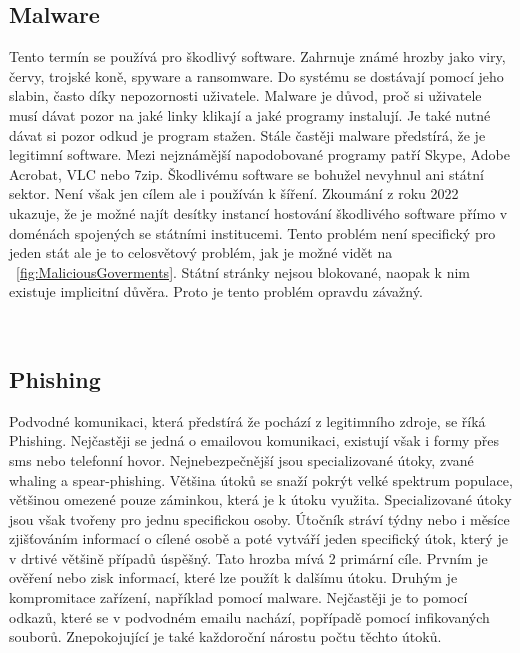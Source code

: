 \subsection{Malware}
Tento termín se používá pro škodlivý software.
Zahrnuje známé hrozby jako viry, červy, trojské koně, spyware a ransomware.
Do systému se dostávají pomocí jeho slabin, často díky nepozornosti uživatele.\cite{cisco_most_common_attack}
Malware je důvod, proč si uživatele musí dávat pozor na jaké linky klikají a jaké programy instalují.
Je také nutné dávat si pozor odkud je program stažen.
Stále častěji malware předstírá, že je legitimní software.
Mezi nejznámější napodobované programy patří Skype, Adobe Acrobat, VLC nebo 7zip.\cite{virustotal_report_findings}
Škodlivému software se bohužel nevyhnul ani státní sektor.
Není však jen cílem ale i používán k šíření.
Zkoumání z roku 2022 ukazuje, že je možné najít desítky instancí hostování škodlivého software přímo v doménách spojených se státními institucemi.\cite{virustotal_report_findings_goverment}
Tento problém není specifický pro jeden stát ale je to celosvětový problém, jak je možné vidět na ~\ref{fig:MaliciousGoverments}.
Státní stránky nejsou blokované, naopak k nim existuje implicitní důvěra.
Proto je tento problém opravdu závažný.

~\label{fig:MaliciousGoverments}

\subsection{Phishing}
Podvodné komunikaci, která předstírá že pochází z legitimního zdroje, se říká Phishing\cite{cisco_most_common_attack}.
Nejčastěji se jedná o emailovou komunikaci, existují však i formy přes sms nebo telefonní hovor.
Nejnebezpečnější jsou specializované útoky, zvané whaling a spear-phishing.
Většina útoků se snaží pokrýt velké spektrum populace, většinou omezené pouze záminkou, která je k útoku využita.
Specializované útoky jsou však tvořeny pro jednu specifickou osoby.
Útočník stráví týdny nebo i měsíce zjišťováním informací o cílené osobě a poté vytváří jeden specifický útok, který je v drtivé většině případů úspěšný.
Tato hrozba mívá 2 primární cíle.
Prvním je ověření nebo zisk informací, které lze použít k dalšímu útoku.
Druhým je kompromitace zařízení, například pomocí malware.
Nejčastěji je to pomocí odkazů, které se v podvodném emailu nachází, popřípadě pomocí infikovaných souborů.
Znepokojující je také každoroční nárostu počtu těchto útoků.\cite{moje_bakalarka}

